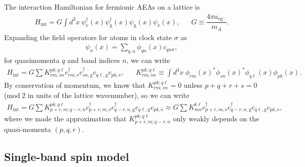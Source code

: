\documentclass[aps,notitlepage,nofootinbib,10pt]{revtex4-1}
\renewcommand{\t}{\text} %
\newcommand{\f}[2]{\dfrac{#1}{#2}} %
\newcommand{\p}[1]{\left(#1\right)} %
\newcommand{\1}{\mathds{1}}
\newcommand{\g}{\text{g}}
\newcommand{\e}{\text{e}}
\begin{document}
The interaction Hamiltonian for fermionic AEAs on a lattice is
\begin{align}
  H_{\t{int}} = G \int d^3x~
  \psi_\e^\dag\p{x} \psi_\g^\dag\p{x} \psi_\g\p{x} \psi_\e\p{x},
  &&
  G \equiv \f{4\pi a_{\e\g^-}}{m_A}.
\end{align}
Expanding the field operators for atoms in clock state $\sigma$ as
\begin{align}
  \psi_\sigma\p{x} = \sum_{q,n} \phi_{qn}\p{x} c_{qn\sigma},
\end{align}
for quasimomenta $q$ and band indices $n$, we can write
\begin{align}
  H_{\t{int}} = G \sum K^{pk;q\ell}_{rm;sn}
  c_{rm,\e}^\dag c_{sn,\g}^\dag c_{q\ell,\g} c_{pk,\e},
  &&
  K^{pk;q\ell}_{rm;sn} \equiv \int d^3x~
  \phi_{rm}\p{x}^* \phi_{sn}\p{x}^* \phi_{q\ell}\p{x} \phi_{pk}\p{x}.
\end{align}
By conservation of momentum, we know that $K^{pk;q\ell}_{rm;sn}=0$
unless $p+q+r+s=0$ ($\t{mod}~2$ in units of the lattice wavenumber),
so we can write
\begin{align}
  H_{\t{int}} = G \sum K^{pk;q\ell}_{p+r,m;q-r,n}
  c_{p+r,m,\e}^\dag c_{q-r,n,\g}^\dag c_{q\ell,\g} c_{pk,\e}
  \approx G \sum K^{k\ell}_{mn}
  c_{p+r,m,\e}^\dag c_{q-r,n,\g}^\dag c_{q\ell,\g} c_{pk,\e},
\end{align}
where we made the approximation that $K^{pk;q\ell}_{p+r,m;q-r,n}$ only
weakly depends on the quasi-momenta $\p{p,q,r}$.

\subsection{Single-band spin model}
\end{document}
